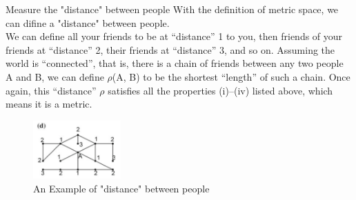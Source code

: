 \documentclass[xcolor=dvipsnames]{beamer}
\theoremstyle{remark}
\begin{document}
\begin{frame}{Measure the "distance" between people}
  \hspace*{1em}With the definition of metric space, we can difine a "distance" between people.\\
  \hspace*{1em}We can define all your friends to be at “distance” 1 to you, then friends of your friends at “distance” 2, their friends at “distance” 3, and so on. Assuming the world is “connected”, that is, there is a chain of friends between any two people A and B, we can define $\rho$(A, B) to be the shortest “length” of such a chain. 
  \hspace*{1em}Once again, this “distance” $\rho$ satisfies all the properties (i)–(iv) listed above, which means it is a metric. \\
  \begin{figure}[H] %
    \centering       %
    \includegraphics[width=0.3\textwidth]{fig2.png} %
    \caption{An Example of "distance" between people} %
    \label{Fig2}   %
\end{figure}
\end{frame}
\end{document}
